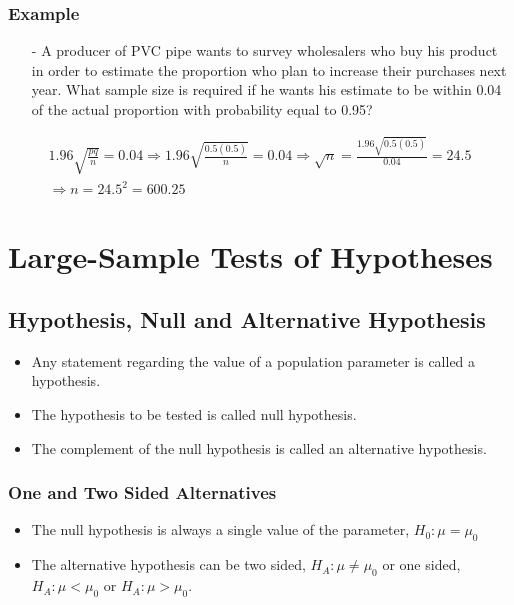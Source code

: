 \documentclass[12pt, letterpaper]{article}
\begin{document}
            \subsubsection*{Example}
                \begin{itemize}
                    \item[-] A producer of PVC pipe wants to survey wholesalers who buy his product in order to estimate the proportion who plan to increase their purchases next year. What sample size is required if he wants his estimate to be within 0.04 of the actual proportion with probability equal to 0.95?
                \end{itemize}
                \begin{mdframed}[leftmargin=0.5cm, rightmargin=0.5cm]
                    \begin{align*}
                        1.96\sqrt{\frac{pq}{n}} = 0.04 \Rightarrow 1.96\sqrt{\frac{0.5(0.5)}{n}} = 0.04 \Rightarrow \sqrt{n} = \frac{1.96\sqrt{0.5(0.5)}}{0.04} = 24.5 \\ \Rightarrow n = 24.5^2 = 600.25
                    \end{align*}
                \end{mdframed}
    \section{Large-Sample Tests of Hypotheses}
        \subsection{Hypothesis, Null and Alternative Hypothesis}
            \begin{itemize}
                \item Any statement regarding the value of a population parameter is called a hypothesis.
                \item The hypothesis to be tested is called null hypothesis.
                \item The complement of the null hypothesis is called an alternative hypothesis.
            \end{itemize}
            \subsubsection{One and Two Sided Alternatives}
                \begin{itemize}
                    \item The null hypothesis is always a single value of the parameter, $H_0 : \mu = \mu_0$
                    \item The alternative hypothesis can be two sided, $H_A : \mu \neq \mu_0$ or one sided, $H_A : \mu < \mu_0$ or $H_A : \mu > \mu_0$.
                \end{itemize}
\end{document}
